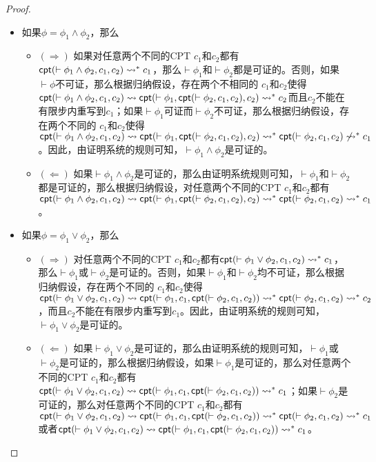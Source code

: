{\begin{proof}
\begin{itemize}
		\item 如果$\phi = \phi_1\wedge \phi_2$，那么
		\begin{itemize}
			\item $(\Rightarrow)$ 如果对任意两个不同的\textsf{CPT} $c_1$和$c_2$都有$\textsf{cpt}(\vdash\phi_1\wedge\phi_2, c_1, c_2)\rightsquigarrow^* c_1$，那么$\vdash\phi_1$和$\vdash\phi_2$都是可证的。否则，如果$\vdash\phi$不可证，那么根据归纳假设，存在两个不相同的\CPT{} $c_1$和$c_2$使得		$\textsf{cpt}(\vdash
			\phi_1\wedge\phi_2, c_1, c_2)\rightsquigarrow \textsf{cpt}(\vdash \phi_1, \textsf{cpt}(\vdash
			\phi_2, c_1, c_2), c_2)\rightsquigarrow^*c_2$而且$c_2$不能在有限步内重写到$c_1$；如果$\vdash\phi_1$可证而$\vdash\phi_2$不可证，那么根据归纳假设，存在两个不同的\CPT{} $c_1$和$c_2$使得$\textsf{cpt}(\vdash
			\phi_1\wedge\phi_2, c_1, c_2)\rightsquigarrow \textsf{cpt}(\vdash \phi_1, \textsf{cpt}(\vdash
			\phi_2, c_1, c_2), c_2)\rightsquigarrow^*\textsf{cpt}(\vdash
			\phi_2, c_1, c_2)\not\rightsquigarrow^*c_1$。因此，由证明系统的规则可知，$\vdash\phi_1\wedge\phi_2$是可证的。
			\item $(\Leftarrow)$ 如果$\vdash\phi_1\wedge\phi_2$是可证的，那么由证明系统规则可知，$\vdash\phi_1$和$\vdash\phi_2$都是可证的，那么根据归纳假设，对任意两个不同的\textsf{CPT} $c_1$和$c_2$都有$\textsf{cpt}(\vdash
			\phi_1\wedge\phi_2, c_1, c_2)\rightsquigarrow \textsf{cpt}(\vdash \phi_1, \textsf{cpt}(\vdash
			\phi_2, c_1, c_2), c_2) \rightsquigarrow^* \textsf{cpt}(\vdash \phi_2, c_1, c_2)\rightsquigarrow^*
			c_1$。
		\end{itemize}
		
		
		\item 如果$\phi = \phi_1\vee\phi_2$，那么
		\begin{itemize}
			\item $(\Rightarrow)$ 对任意两个不同的\textsf{CPT} $c_1$和$c_2$都有$\textsf{cpt}(\vdash \phi_1\vee\phi_2,
			c_1, c_2)\rightsquigarrow^* c_1$，那么$\vdash\phi_1$或$\vdash\phi_2$是可证的。否则，如果$\vdash\phi_1$和$\vdash\phi_2$均不可证，那么根据归纳假设，存在两个不同的\CPT{} $c_1$和$c_2$使得 
			$\textsf{cpt}(\vdash\phi_1\vee\phi_2, c_1,
			c_2)\rightsquigarrow \textsf{cpt}(\vdash \phi_1, c_1, \textsf{cpt}(\vdash\phi_2, c_1, c_2))\rightsquigarrow^*\textsf{cpt}(\vdash\phi_2, c_1, c_2)\rightsquigarrow^*
			c_2$，而且$c_2$不能在有限步内重写到$c_1$。因此，由证明系统的规则可知，$\vdash\phi_1\vee\phi_2$是可证的。
			\item $(\Leftarrow)$ 如果$\vdash\phi_1\vee\phi_2$是可证的，那么由证明系统的规则可知，$\vdash\phi_1$或$\vdash\phi_2$是可证的，那么根据归纳假设，如果$\vdash\phi_1$是可证的，那么对任意两个不同的\textsf{CPT} $c_1$和$c_2$都有$\textsf{cpt}(\vdash\phi_1\vee\phi_2, c_1,
			c_2)\rightsquigarrow \textsf{cpt}(\vdash \phi_1, c_1, \textsf{cpt}(\vdash\phi_2, c_1, c_2))\rightsquigarrow^*
			c_1$；如果$\vdash\phi_2$是可证的，那么对任意两个不同的\textsf{CPT} $c_1$和$c_2$都有$\textsf{cpt}(\vdash\phi_1\vee\phi_2, c_1, c_2)\rightsquigarrow \textsf{cpt}(\vdash
			\phi_1, c_1, \textsf{cpt}(\vdash\phi_2, c_1, c_2))\rightsquigarrow^* \textsf{cpt}(\vdash\phi_2,
			c_1, c_2) \rightsquigarrow^* c_1$或者$\textsf{cpt}(\vdash\phi_1\vee\phi_2, c_1, c_2)\rightsquigarrow \textsf{cpt}(\vdash
			\phi_1, c_1, \textsf{cpt}(\vdash\phi_2, c_1, c_2))\rightsquigarrow^* c_1$。
		\end{itemize}
		

\end{itemize}
\end{proof}}
